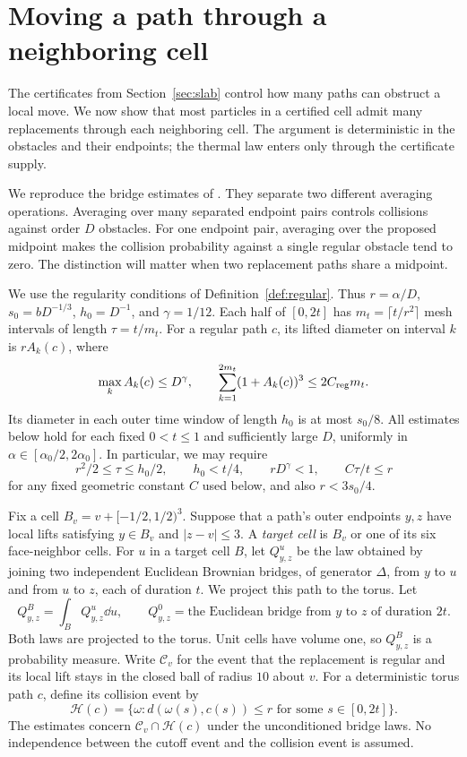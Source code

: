\section{Moving a path through a neighboring cell}
\label{sec:bridges}

The certificates from Section~\ref{sec:slab} control how many paths
can obstruct a local move.  We now show that most particles in a certified
cell admit many replacements through each neighboring cell.  The argument
is deterministic in the obstacles and their endpoints; the thermal law
enters only through the certificate supply.

We reproduce the bridge estimates of \citet[Section~5]{HS}.
They separate two different averaging operations.  Averaging over many
separated endpoint pairs controls collisions against order $D$ obstacles.
For one endpoint pair, averaging over the proposed midpoint makes the
collision probability against a single regular obstacle tend to zero.
The distinction will matter when two replacement paths share a midpoint.

We use the regularity conditions of Definition~\ref{def:regular}.
Thus $r=\alpha/D$, $s_0=bD^{-1/3}$, $h_0=D^{-1}$, and $\gamma=1/12$.
Each half of $[0,2t]$ has $m_t=\lceil t/r^2\rceil$ mesh intervals of length
$\tau=t/m_t$.  For a regular path $c$, its lifted diameter on interval $k$
is $rA_k(c)$, where
\begin{equation}\label{bridge:oscillations}
 \max_k A_k(c)\le D^\gamma,
 \qquad
 \sum_{k=1}^{2m_t}(1+A_k(c))^3\le 2C_{\rm reg}m_t.
\end{equation}
Its diameter in each outer time window of length $h_0$ is at most $s_0/8$.
All estimates below hold for each fixed $0<t\le1$ and sufficiently large
$D$, uniformly in $\alpha\in[\alpha_0/2,2\alpha_0]$.  In particular, we
may require
\begin{equation}\label{bridge:scale-restrictions}
 r^2/2\le\tau\le h_0/2,\qquad h_0<t/4,\qquad rD^\gamma<1,
 \qquad C\tau/t\le r
\end{equation}
for any fixed geometric constant $C$ used below, and also $r<3s_0/4$.

Fix a cell $B_v=v+[-1/2,1/2)^3$.  Suppose that a path's outer endpoints
$y,z$ have local lifts satisfying $y\in B_v$ and $|z-v|\le3$.  A
\emph{target cell} is $B_v$ or one of its six face-neighbor cells.  For
$u$ in a target cell $B$, let $Q_{y,z}^u$ be the law obtained by joining two
independent Euclidean Brownian bridges, of generator $\Delta$, from $y$
to $u$ and from $u$ to $z$, each of duration $t$.  We project this path to
the torus.  Let
\[
 Q_{y,z}^{B}=\int_B Q_{y,z}^u\dd u,
 \qquad
 Q_{y,z}^{0}=\text{the Euclidean bridge from $y$ to $z$ of duration $2t$}.
\]
Both laws are projected to the torus.  Unit cells have volume one, so
$Q_{y,z}^{B}$ is a probability measure.
Write $\mathcal C_v$ for the event that the replacement is regular and
its local lift stays in the closed ball of radius $10$ about $v$.
For a deterministic torus path $c$, define its collision event by
\[
 \mathcal H(c)=
 \{\omega: d(\omega(s),c(s))\le r\text{ for some }s\in[0,2t]\}.
\]
The estimates concern $\mathcal C_v\cap\mathcal H(c)$ under the
unconditioned bridge laws.  No independence between the cutoff event and
the collision event is assumed.

